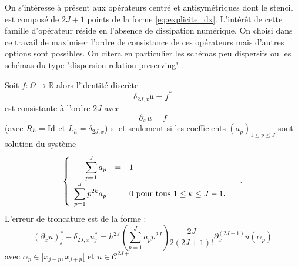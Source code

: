 On s'intéresse à présent aux opérateurs centré et antisymétriques dont le stencil est composé de $2J+1$ points de la forme \eqref{eq:explicite_dx}. L'intérêt de cette famille d'opérateur réside en l'absence de dissipation numérique. On choisi dans ce travail de maximiser l'ordre de consistance de ces opérateurs mais d'autres options sont possibles. On citera en particulier les schémas peu dispersifs \cite{Bogey2004} ou les schémas du type "dispersion relation preserving" \cite{Tam1993}.

\begin{theoreme}
Soit $f : \Omega \rightarrow \mathbb{R}$ alors l'identité discrète
\begin{equation}
\delta_{2J,x} \mathfrak{u} = f^*
\end{equation}
est consistante à l'ordre $2J$ avec 
\begin{equation}
\partial_x u = f
\end{equation}
(avec $R_h = \text{Id}$ et $L_h = \delta_{2J,x}$) si et seulement si les coefficients $(a_p)_{1 \leq p \leq J}$ sont solution du système
\begin{equation}
\left\lbrace
\begin{array}{rcll}
\displaystyle\sum\limits_{p=1}^J a_p & = & 1 & \\
\displaystyle\sum\limits_{p=1}^J p^{2k} a_p & = & 0 \text{ pour tous } 1 \leq k \leq J-1.
\end{array}
\right. .
\label{eq:syst_opexplicite_P}
\end{equation}
L'erreur de troncature est de la forme :
\begin{equation}
\left(\partial_x u \right)_j^* - \delta_{2J,x} u^*_j = h^{2J} \left(  \sum_{p=1}^J a_p p^{2J} \right) \dfrac{2J}{2(2J+1)!} \partial^{(2J+1)}_x u(\alpha_p)
\end{equation} 
avec $\alpha_p \in ]x_{j-p}, x_{j+p}[$ et $u \in \mathcal{C}^{2J+1}$.
\label{th:consistance_delta_x_explicite}
\end{theoreme}


